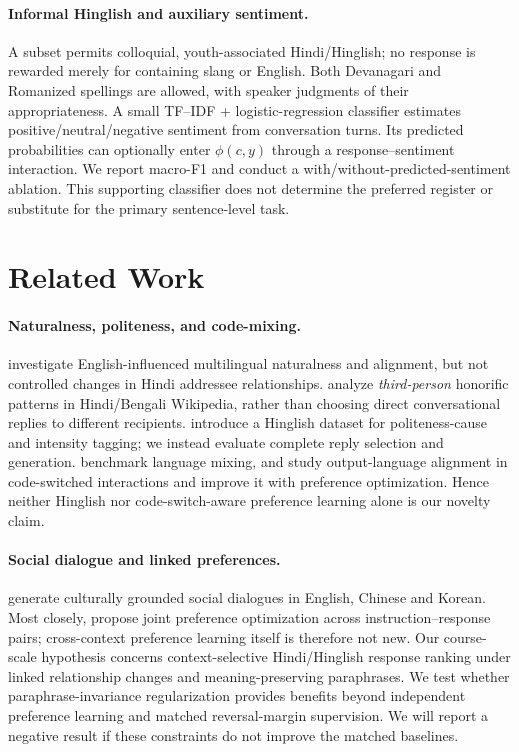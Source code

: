 \documentclass[11pt]{article}
\begin{document}
\paragraph{Informal Hinglish and auxiliary sentiment.}
A subset permits colloquial, youth-associated Hindi/Hinglish; no response is rewarded merely for containing slang or English. Both Devanagari and Romanized spellings are allowed, with speaker judgments of their appropriateness. A small TF--IDF + logistic-regression classifier estimates positive/neutral/negative sentiment from conversation turns. Its predicted probabilities can optionally enter $\phi(c,y)$ through a response--sentiment interaction. We report macro-F1 and conduct a with/without-predicted-sentiment ablation. This supporting classifier does not determine the preferred register or substitute for the primary sentence-level task.

\section{Related Work}
\paragraph{Naturalness, politeness, and code-mixing.}
\citet{guo2025accent} investigate English-influenced multilingual naturalness and alignment, but not controlled changes in Hindi addressee relationships. \citet{mukherjee2025honorific} analyze \emph{third-person} honorific patterns in Hindi/Bengali Wikipedia, rather than choosing direct conversational replies to different recipients. \citet{priya2024hingpoem} introduce a Hinglish dataset for politeness-cause and intensity tagging; we instead evaluate complete reply selection and generation. \citet{yang2025codemix} benchmark language mixing, and \citet{oh2026ola} study output-language alignment in code-switched interactions and improve it with preference optimization. Hence neither Hinglish nor code-switch-aware preference learning alone is our novelty claim.

\paragraph{Social dialogue and linked preferences.}
\citet{hong2025normgenesis} generate culturally grounded social dialogues in English, Chinese and Korean. Most closely, \citet{bansal2025jpo} propose joint preference optimization across instruction--response pairs; cross-context preference learning itself is therefore not new. Our course-scale hypothesis concerns context-selective Hindi/Hinglish response ranking under linked relationship changes and meaning-preserving paraphrases. We test whether paraphrase-invariance regularization provides benefits beyond independent preference learning and matched reversal-margin supervision. We will report a negative result if these constraints do not improve the matched baselines.
\end{document}
